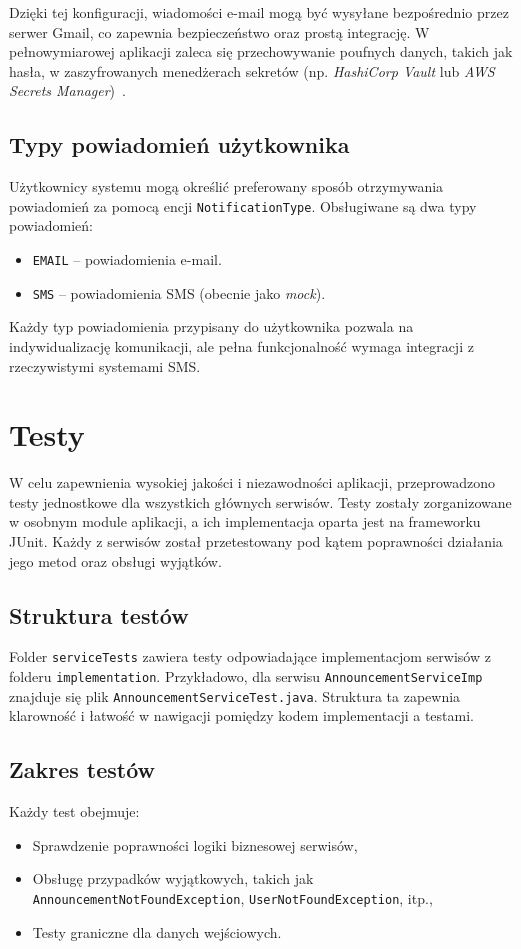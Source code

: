 Dzięki tej konfiguracji, wiadomości e-mail mogą być wysyłane bezpośrednio przez serwer Gmail, co zapewnia bezpieczeństwo oraz prostą integrację. W pełnowymiarowej aplikacji zaleca się przechowywanie poufnych danych, takich jak hasła, w zaszyfrowanych menedżerach sekretów 
(np. \emph{HashiCorp Vault} lub \emph{AWS Secrets Manager})~\cite{hashicorp_vault, aws_secret}.


\subsection{Typy powiadomień użytkownika}

Użytkownicy systemu mogą określić preferowany sposób otrzymywania powiadomień za pomocą encji \texttt{NotificationType}. Obsługiwane są dwa typy powiadomień:
\begin{itemize}
    \item \texttt{EMAIL} -- powiadomienia e-mail.
    \item \texttt{SMS} -- powiadomienia SMS (obecnie jako \emph{mock}).
\end{itemize}

Każdy typ powiadomienia przypisany do użytkownika pozwala na indywidualizację komunikacji, ale pełna funkcjonalność wymaga integracji z rzeczywistymi systemami SMS. 


\section{Testy}
W celu zapewnienia wysokiej jakości i niezawodności aplikacji, przeprowadzono testy jednostkowe dla wszystkich głównych serwisów. Testy zostały zorganizowane w osobnym module aplikacji, a ich implementacja oparta jest na frameworku JUnit. Każdy z serwisów został przetestowany pod kątem poprawności działania jego metod oraz obsługi wyjątków.

\subsection{Struktura testów}
Folder \texttt{serviceTests} zawiera testy odpowiadające implementacjom serwisów z folderu \texttt{implementation}. Przykładowo, dla serwisu \texttt{AnnouncementServiceImp} znajduje się plik \texttt{AnnouncementServiceTest.java}. Struktura ta zapewnia klarowność i łatwość w nawigacji pomiędzy kodem implementacji a testami.

\subsection{Zakres testów}
Każdy test obejmuje:
\begin{itemize}
    \item Sprawdzenie poprawności logiki biznesowej serwisów,
    \item Obsługę przypadków wyjątkowych, takich jak \texttt{AnnouncementNotFoundException}, \texttt{UserNotFoundException}, itp.,
    \item Testy graniczne dla danych wejściowych.
\end{itemize}

